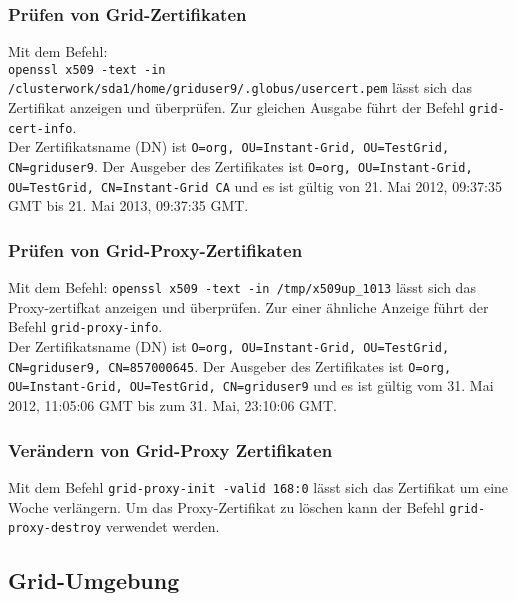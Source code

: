 	\subsubsection{Prüfen von Grid-Zertifikaten}
		Mit dem Befehl: \\
		\texttt{openssl x509 -text -in /clusterwork/sda1/home/griduser9/.globus/usercert.pem}
		lässt sich das Zertifikat anzeigen und überprüfen.
		Zur gleichen Ausgabe führt der Befehl \texttt{grid-cert-info}.\\
		Der Zertifikatsname (DN) ist \texttt{O=org, OU=Instant-Grid, OU=TestGrid, CN=griduser9}.
		Der Ausgeber des Zertifikates ist \texttt{O=org, OU=Instant-Grid, OU=TestGrid, CN=Instant-Grid CA}
		und es ist gültig von 21. Mai 2012, 09:37:35 GMT bis 21. Mai 2013, 09:37:35 GMT.
		
	\subsubsection{Prüfen von Grid-Proxy-Zertifikaten}
		Mit dem Befehl:
		\texttt{openssl x509 -text -in /tmp/x509up\_1013}
		lässt sich das Proxy-zertifkat anzeigen und überprüfen.
		Zur einer ähnliche Anzeige führt der Befehl 
		\texttt{grid-proxy-info}.\\
		Der Zertifikatsname (DN) ist \texttt{O=org, OU=Instant-Grid, OU=TestGrid, CN=griduser9, CN=857000645}.
		Der Ausgeber des Zertifikates ist \texttt{O=org, OU=Instant-Grid, OU=TestGrid, CN=griduser9}
		und es ist gültig vom 31. Mai 2012, 11:05:06 GMT bis zum 31. Mai, 23:10:06 GMT.
		
	\subsubsection{Verändern von Grid-Proxy Zertifikaten}
		Mit dem Befehl
		\texttt{grid-proxy-init -valid 168:0}
		lässt sich das Zertifikat um eine Woche verlängern.
		Um das Proxy-Zertifikat zu löschen kann der Befehl
		\texttt{grid-proxy-destroy}
		verwendet werden.

\subsection{Grid-Umgebung}
